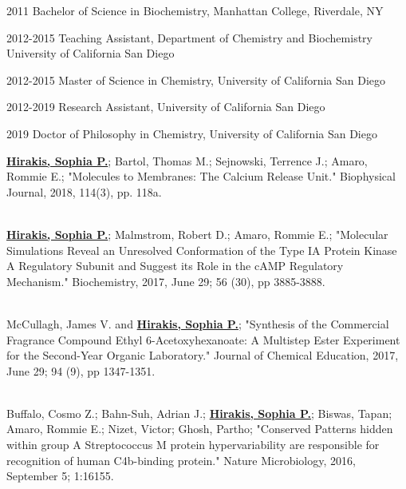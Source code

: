 \documentclass[12pt]{ucsddissertation}
\begin{document}
\begin{vita}
\noindent
\begin{cv}{}
\begin{cvlist}{}
\item[2011] Bachelor of Science in Biochemistry, Manhattan College, Riverdale, NY
\item[2012-2015] Teaching Assistant, Department of Chemistry and Biochemistry\\University of California San Diego
\item[2012-2015] Master of Science in Chemistry, University of California San
Diego
\item[2012-2019] Research Assistant, University of California San
Diego
\item[2019] Doctor of Philosophy in Chemistry, University of California San
Diego
\end{cvlist}
\end{cv}

\publications

\noindent \textbf{\underline{Hirakis, Sophia P.}}; Bartol, Thomas M.; Sejnowski, Terrence J.; Amaro, Rommie E.; "Molecules to Membranes: The Calcium Release Unit." Biophysical Journal, 2018, 114(3),  pp. 118a.

\noindent \\ \textbf{\underline{Hirakis, Sophia P.}}; Malmstrom, Robert D.; Amaro, Rommie E.; "Molecular Simulations Reveal an Unresolved Conformation of the Type IA Protein Kinase A Regulatory Subunit and Suggest its Role in the cAMP Regulatory Mechanism." Biochemistry, 2017, June 29; 56 (30), pp 3885-3888.

\noindent \\McCullagh, James V. and \textbf{\underline{Hirakis, Sophia P.}}; "Synthesis of the Commercial Fragrance Compound Ethyl 6-Acetoxyhexanoate: A Multistep Ester Experiment for the Second-Year Organic Laboratory." Journal of Chemical Education, 2017, June 29; 94 (9), pp 1347-1351.

\noindent \\Buffalo, Cosmo Z.; Bahn-Suh, Adrian J.; \textbf{\underline{Hirakis, Sophia P.}}; Biswas, Tapan; Amaro, Rommie E.; Nizet, Victor; Ghosh, Partho; "Conserved Patterns hidden within group A Streptococcus M protein hypervariability are responsible for recognition of human C4b-binding protein." Nature Microbiology, 2016, September 5; 1:16155.


\end{vita}
\end{document}
